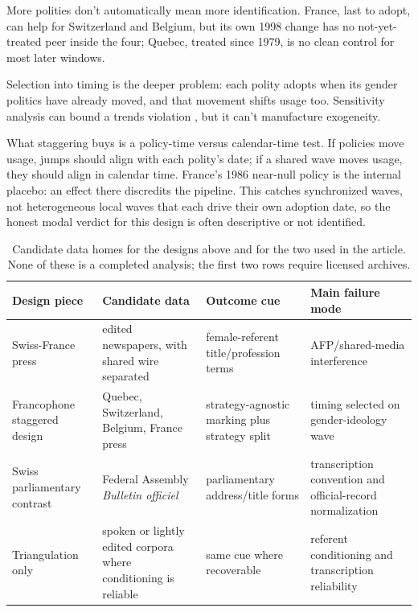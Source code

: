 \documentclass[11pt]{article}
\begin{document}
More polities don't automatically mean more identification. France, last to adopt, can help for Switzerland and Belgium, but its own 1998 change has no not-yet-treated peer inside the four; Quebec, treated since 1979, is no clean control for most later windows.

Selection into timing is the deeper problem: each polity adopts when its gender politics have already moved, and that movement shifts usage too. Sensitivity analysis can bound a trends violation \citep{RambachanRoth2023}, but it can't manufacture exogeneity.

What staggering buys is a policy-time versus calendar-time test. If policies move usage, jumps should align with each polity's date; if a shared wave moves usage, they should align in calendar time. France's 1986 near-null policy is the internal placebo: an effect there discredits the pipeline. This catches synchronized waves, not heterogeneous local waves that each drive their own adoption date, so the honest modal verdict for this design is often descriptive or not identified.

\FloatBarrier

\begin{table}[!ht]
\centering
\scriptsize
\caption{Candidate data homes for the designs above and for the two used in the article. None of these is a completed analysis; the first two rows require licensed archives.}
\label{tab:datahomes}
\begin{tabular}{@{}p{} p{} p{} p{}@{}}
\toprule
\textbf{Design piece} & \textbf{Candidate data} & \textbf{Outcome cue} & \textbf{Main failure mode} \\
\midrule
Swiss-France press & edited newspapers, with shared wire separated & female-referent title/profession terms & AFP/shared-media interference \\
Francophone staggered design & Quebec, Switzerland, Belgium, France press & strategy-agnostic marking plus strategy split & timing selected on gender-ideology wave \\
Swiss parliamentary contrast & Federal Assembly \emph{Bulletin officiel} & parliamentary address/title forms & transcription convention and official-record normalization \\
Triangulation only & spoken or lightly edited corpora where conditioning is reliable & same cue where recoverable & referent conditioning and transcription reliability \\
\bottomrule
\end{tabular}
\end{table}

\printbibliography
\end{document}
